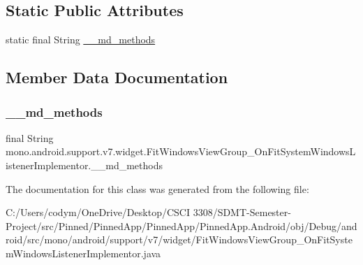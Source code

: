 \subsection*{Static Public Attributes}
\begin{DoxyCompactItemize}
\item 
static final String \hyperlink{classmono_1_1android_1_1support_1_1v7_1_1widget_1_1_fit_windows_view_group___on_fit_system_windows_listener_implementor_a4bfebff3c5afa405dc21820881b44472}{\+\_\+\+\_\+md\+\_\+methods}
\end{DoxyCompactItemize}


\subsection{Member Data Documentation}
\mbox{\label{classmono_1_1android_1_1support_1_1v7_1_1widget_1_1_fit_windows_view_group___on_fit_system_windows_listener_implementor_a4bfebff3c5afa405dc21820881b44472}} 
\subsubsection{\texorpdfstring{\+\_\+\+\_\+md\+\_\+methods}{\_\_md\_methods}}
{\footnotesize\ttfamily final String mono.\+android.\+support.\+v7.\+widget.\+Fit\+Windows\+View\+Group\+\_\+\+On\+Fit\+System\+Windows\+Listener\+Implementor.\+\_\+\+\_\+md\+\_\+methods\hspace{0.3cm}{\ttfamily [static]}}



The documentation for this class was generated from the following file\+:\begin{DoxyCompactItemize}
\item 
C\+:/\+Users/codym/\+One\+Drive/\+Desktop/\+C\+S\+C\+I 3308/\+S\+D\+M\+T-\/\+Semester-\/\+Project/src/\+Pinned/\+Pinned\+App/\+Pinned\+App/\+Pinned\+App.\+Android/obj/\+Debug/android/src/mono/android/support/v7/widget/Fit\+Windows\+View\+Group\+\_\+\+On\+Fit\+System\+Windows\+Listener\+Implementor.\+java\end{DoxyCompactItemize}
